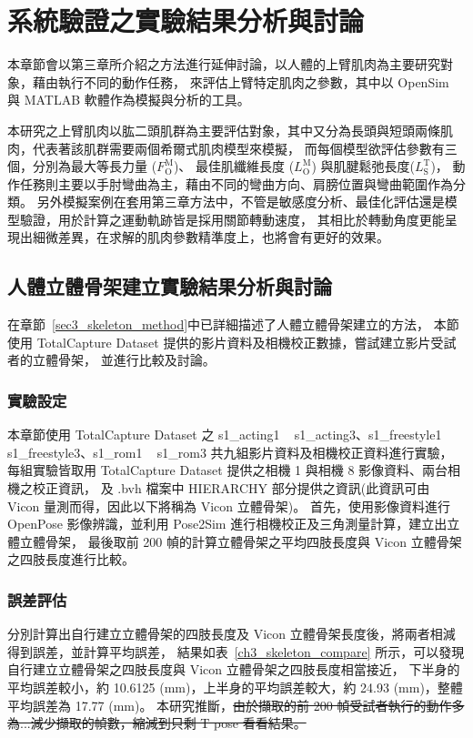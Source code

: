 \chapter{系統驗證之實驗結果分析與討論}
\fontsize{12pt}{18pt}\selectfont %

本章節會以第三章所介紹之方法進行延伸討論，以人體的上臂肌肉為主要研究對象，藉由執行不同的動作任務，
來評估上臂特定肌肉之參數，其中以 OpenSim 與 MATLAB 軟體作為模擬與分析的工具。

本研究之上臂肌肉以肱二頭肌群為主要評估對象，其中又分為長頭與短頭兩條肌肉，代表著該肌群需要兩個希爾式肌肉模型來模擬，
而每個模型欲評估參數有三個，分別為最大等長力量 ($F^\mathrm{M}_\mathrm{O}$)、
最佳肌纖維長度 ($L^\mathrm{M}_\mathrm{O}$) 與肌腱鬆弛長度($L^\mathrm{T}_\mathrm{S}$)，
動作任務則主要以手肘彎曲為主，藉由不同的彎曲方向、肩膀位置與彎曲範圍作為分類。
另外模擬案例在套用第三章方法中，不管是敏感度分析、最佳化評估還是模型驗證，用於計算之運動軌跡皆是採用關節轉動速度，
其相比於轉動角度更能呈現出細微差異，在求解的肌肉參數精準度上，也將會有更好的效果。

\section{人體立體骨架建立實驗結果分析與討論}\label{sec4_skeleton_exp}
在章節~\ref{sec3_skeleton_method}中已詳細描述了人體立體骨架建立的方法，
本節使用 TotalCapture Dataset 提供的影片資料及相機校正數據，嘗試建立影片受試者的立體骨架，
並進行比較及討論。

\subsection{實驗設定}
本章節使用 TotalCapture Dataset 之 s1\_acting1 ~ s1\_acting3、s1\_freestyle1 ~ s1\_freestyle3、s1\_rom1 ~ s1\_rom3 共九組影片資料及相機校正資料進行實驗，
每組實驗皆取用 TotalCapture Dataset 提供之相機 1 與相機 8 影像資料、兩台相機之校正資訊，
及 .bvh 檔案中 HIERARCHY 部分提供之資訊(此資訊可由 Vicon 量測而得，因此以下將稱為 Vicon 立體骨架)。
首先，使用影像資料進行 OpenPose 影像辨識，並利用 Pose2Sim 進行相機校正及三角測量計算，建立出立體立體骨架，
最後取前 200 幀的計算立體骨架之平均四肢長度與 Vicon 立體骨架之四肢長度進行比較。

\subsection{誤差評估}
分別計算出自行建立立體骨架的四肢長度及 Vicon 立體骨架長度後，將兩者相減得到誤差，並計算平均誤差，
結果如表~\ref{ch3_skeleton_compare} 所示，可以發現自行建立立體骨架之四肢長度與 Vicon 立體骨架之四肢長度相當接近，
下半身的平均誤差較小，約 10.6125 (mm)，上半身的平均誤差較大，約 24.93 (mm)，整體平均誤差為 17.77 (mm)。
本研究推斷，\sout{由於擷取的前 200 幀受試者執行的動作多為...減少擷取的幀數，縮減到只剩 T pose 看看結果。}

